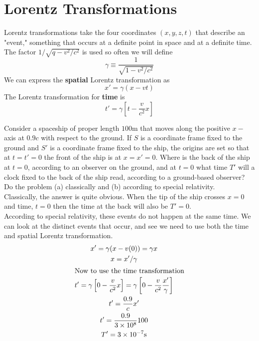 \section{Lorentz Transformations}
Lorentz transformations take the four coordinates $ (x,y,z,t) $ that describe an "event," something that occurs at a definite point in space and at a definite time. \\ 
The factor $ 1/\sqrt{q - v^2 /c^2} $ is used so often we will define
\[ \gamma  \equiv \dfrac{1}{\sqrt{1-v^2/c^2}} \]
We can express the \textbf{spatial} Lorentz transformation as
\[ x' = \gamma (x-vt) \]
The Lorentz transformation for \textbf{time} is
\[ t' = \gamma \left[t - \dfrac{v}{c^2}x\right] \]
\begin{example}
	Consider a spaceship of proper length $ 100 $m that moves along the positive $ x- $axis at $ 0.9c $ with respect to the ground. If $ S $ is a coordinate frame fixed to the ground and $ S' $ is a coordinate frame fixed to the ship, the origins are set so that at $ t = t' = 0$ the front of the ship is at $ x = x' =0 $. Where is the back of the ship at $ t = 0 $, according to an observer on the ground, and at $ t = 0 $ what time $ T' $ will a clock fixed to the back of the ship read, according to a ground-based observer? Do the problem (a) classically and (b) according to special relativity.  \\
	Classically, the answer is quite obvious. When the tip of the ship crosses $ x = 0 $ and time, $ t = 0 $ then the time at the back will also be $ T' =0 $. \\
	According to special relativity, these events do not happen at the same time. We can look at the distinct events that occur, and see we need to use both the time and spatial Lorentz transformation. 
	\begin{gather*}
		x' = \gamma(x-v(0))= \gamma x \\
		x = x'/\gamma \\
		\intertext{Now to use the time transformation}
		t' = \gamma\left[0 - \dfrac{v}{c^2}x\right] = \gamma\left[0 - \dfrac{v}{c^2} \dfrac{x'}{\gamma}\right] \\
		t' = \dfrac{0.9}{c} x' \\
		t' = \dfrac{0.9}{3 \times 10^{8}} 100 \\
		T' = 3 \times 10^{-7} \mbox{s}
	\end{gather*}
\end{example}
